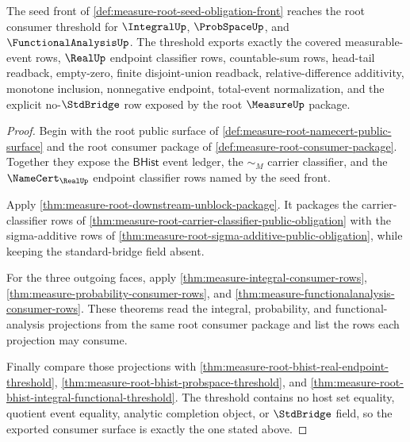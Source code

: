 \begin{theorem}
\label{thm:measure-root-seed-consumer-threshold}
The seed front of \autoref{def:measure-root-seed-obligation-front} reaches
the root consumer threshold for $\IntegralUp$, $\ProbSpaceUp$, and
$\FunctionalAnalysisUp$. The threshold exports exactly the covered
measurable-event rows, $\RealUp$ endpoint classifier rows, countable-sum
rows, head-tail readback, empty-zero, finite disjoint-union readback,
relative-difference additivity, monotone inclusion, nonnegative endpoint,
total-event normalization, and the explicit no-$\StdBridge$ row exposed by
the root $\MeasureUp$ package.
\end{theorem}
\begin{proof}
Begin with the root public surface of
\autoref{def:measure-root-namecert-public-surface} and the root consumer
package of \autoref{def:measure-root-consumer-package}. Together they expose
the $\mathsf{BHist}$ event ledger, the $\sim_M$ carrier classifier, and the
$\NameCert_{\RealUp}$ endpoint classifier rows named by the seed front.

Apply \autoref{thm:measure-root-downstream-unblock-package}. It packages the
carrier-classifier rows of
\autoref{thm:measure-root-carrier-classifier-public-obligation} with the
sigma-additive rows of
\autoref{thm:measure-root-sigma-additive-public-obligation}, while keeping
the standard-bridge field absent.

For the three outgoing faces, apply
\autoref{thm:measure-integral-consumer-rows},
\autoref{thm:measure-probability-consumer-rows}, and
\autoref{thm:measure-functionalanalysis-consumer-rows}. These theorems read
the integral, probability, and functional-analysis projections from the same
root consumer package and list the rows each projection may consume.

Finally compare those projections with
\autoref{thm:measure-root-bhist-real-endpoint-threshold},
\autoref{thm:measure-root-bhist-probspace-threshold}, and
\autoref{thm:measure-root-bhist-integral-functional-threshold}. The threshold
contains no host set equality, quotient event equality, analytic completion
object, or $\StdBridge$ field, so the exported consumer surface is exactly the
one stated above.
\end{proof}
